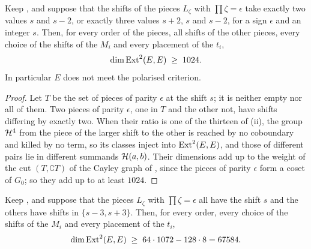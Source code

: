 \begin{theorem}\label{thm:efourspreadtwo}
Keep , and suppose that the shifts of the pieces
$L_{\zeta}$ with $\prod\zeta=\epsilon$ take exactly two values $s$ and $s-2$,
or exactly three values $s+2$, $s$ and $s-2$, for a sign $\epsilon$ and an
integer $s$. Then, for every order of the pieces, all shifts of the other
pieces, every choice of the shifts of the $M_{i}$ and every placement of the
$t_{i}$,
\[
  \dim\operatorname{Ext}^{2}(E,E)\;\ge\;1024 .
\]
In particular $E$ does not meet the polarised criterion.
\end{theorem}

\begin{proof}
Let $T$ be the set of pieces of parity $\epsilon$ at the shift $s$; it is
neither empty nor all of them. Two pieces of parity $\epsilon$, one in $T$
and the other not, have shifts differing by exactly two. When their ratio is
one of the thirteen of (ii), the group $\mathcal{H}^{4}$ from
the piece of the larger shift to the other is reached by no coboundary and
killed by no term, so its classes inject into $\operatorname{Ext}^{2}(E,E)$, and those of
different pairs lie in different summands $\mathcal{H}(a,b)$. Their dimensions add up
to the weight of the cut $(T,\complement T)$ of the Cayley graph of
, since the pieces of parity $\epsilon$ form a coset of
$G_{0}$; so they add up to at least $1024$.
\end{proof}

\begin{theorem}\label{thm:efourspreadthree}
Keep , and suppose that the pieces $L_{\zeta}$ with
$\prod\zeta=\epsilon$ all have the shift $s$ and the others have shifts in
$\{s-3,s+3\}$. Then, for every order, every choice of the shifts of the
$M_{i}$ and every placement of the $t_{i}$,
\[
  \dim\operatorname{Ext}^{2}(E,E)\;\ge\;64\cdot1072-128\cdot8=67584 .
\]
\end{theorem}

